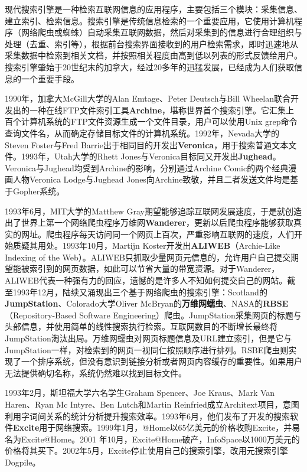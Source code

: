 \begin{shaded}
现代搜索引擎是一种检索互联网信息的应用程序，主要包括三个模块：采集信息、建立索引、检索信息。搜索引擎是传统信息检索的一个重要应用，它使用计算机程序（网络爬虫或蜘蛛）自动采集互联网数据，然后对采集到的信息进行合理组织与处理（去重、索引等），根据前台搜索界面接收到的用户检索需求，即时迅速地从采集数据中检索到相关文档，并按照相关程度由高到低以列表的形式反馈给用户。搜索引擎肇始于20世纪末的加拿大，经过20多年的迅猛发展，已经成为人们获取信息的一个重要手段。

1990年，加拿大McGill大学的Alan Emtage、Peter Deutsch与Bill Wheelan联合开发出的一种在线FTP文件索引工具\textbf{Archine}，堪称世界首个搜索引擎。它汇集上百个计算机系统的FTP文件资源生成一个文件目录，用户可以使用Unix grep命令查询文件名，从而确定存储目标文件的计算机系统。1992年，Nevada大学的Steven Foster与Fred Barrie出于相同目的开发出\textbf{Veronica}，用于搜索普通文本文件。1993年，Utah大学的Rhett Jones与Veronica目标同又开发出\textbf{Jughead}。Veronica与Jughead均受到Archine的影响，分别通过Archine Comic的两个经典漫画人物Veronica Lodge与Jughead Jones向Archine致敬，并且二者发送文件均是基于Gopher系统。

1993年6月，MIT大学的Matthew Gray期望能够追踪互联网发展速度，于是就创造出了世界上第一个网络爬虫程序万维网\textbf{Wanderer}，更新以后爬虫程序能够获取真实的网址。爬虫程序每天访问同一个网页上百次，严重影响互联网的速度，人们开始质疑其用处。1993年10月，Martijn Koster开发出\textbf{ALIWEB}（Archie-Like Indexing of the Web）。ALIWEB只抓取少量网页元信息的，允许用户自己提交期望能被索引到的网页数据，如此可以节省大量的带宽资源。对于Wanderer，ALIWEB代表一种强有力的回应，遗憾的是许多人不知如何提交自己的网站。截至1993年12月，陆续又涌现出三个基于网络爬虫的搜索引擎：Scotland的\textbf{JumpStation}、Colorado大学Oliver McBryan的\textbf{万维网蠕虫}、NASA的\textbf{RBSE}（Repository-Based Software Engineering）爬虫。JumpStation采集网页的标题与头部信息，并使用简单的线性搜索执行检索。互联网数目的不断增长最终将JumpStation淘汰出局。万维网蠕虫对网页标题信息及URL建立索引，但是它与JumpStation一样，对检索到的网页一视同仁按照顺序进行排列。RSBE爬虫则实现了一个排序系统，但没有意识到链接分析或者网页内容缓存的重要性。如果用户无法提供确切名称，系统仍然难以找到目标文件。

1993年2月，斯坦福大学六名学生Graham Spencer、Joe Kraus、Mark Van Haren、Ryan Mc Intyre、Ben Lutch和Martin Reinfried成立Architext项目，意图利用字词间关系的统计分析提升搜索效率。1993年6月，他们发布了开发的搜索软件\textbf{Excite}用于网络搜索。1999年1月，@Home以65亿美元的价格收购Excite，并易名为Excite@Home。2001 年10月，Excite@Home破产，InfoSpace以1000万美元的价格将其买下。2002年5月，Excite停止使用自己的搜索引擎，改用元搜索引擎Dogpile。


\end{shaded}
